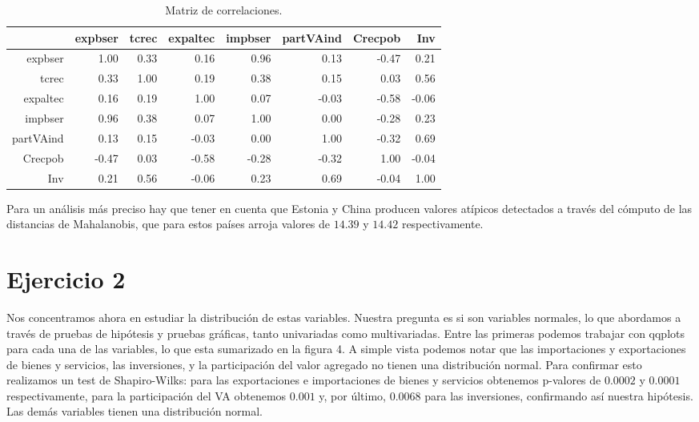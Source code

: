 \documentclass[a4paper,10pt]{article}
\begin{document}
\begin{table}[ht]
\centering
\begin{tabular}{rrrrrrrr}
  \hline
 & expbser & tcrec & expaltec & impbser & partVAind & Crecpob & Inv \\ 
  \hline
expbser & 1.00 & 0.33 & 0.16 & 0.96 & 0.13 & -0.47 & 0.21 \\ 
  tcrec & 0.33 & 1.00 & 0.19 & 0.38 & 0.15 & 0.03 & 0.56 \\ 
  expaltec & 0.16 & 0.19 & 1.00 & 0.07 & -0.03 & -0.58 & -0.06 \\ 
  impbser & 0.96 & 0.38 & 0.07 & 1.00 & 0.00 & -0.28 & 0.23 \\ 
  partVAind & 0.13 & 0.15 & -0.03 & 0.00 & 1.00 & -0.32 & 0.69 \\ 
  Crecpob & -0.47 & 0.03 & -0.58 & -0.28 & -0.32 & 1.00 & -0.04 \\ 
  Inv & 0.21 & 0.56 & -0.06 & 0.23 & 0.69 & -0.04 & 1.00 \\ 
   \hline
\end{tabular}
\caption{Matriz de correlaciones.}
\end{table}

Para un análisis más preciso hay que tener en cuenta que Estonia y China producen valores atípicos detectados a través del cómputo de las distancias
de Mahalanobis, que para estos países arroja valores de $14.39$ y $14.42$ respectivamente.

\section{Ejercicio 2}

Nos concentramos ahora en estudiar la distribución de estas variables. Nuestra pregunta es si son variables normales, lo que abordamos a través de 
pruebas de hipótesis y pruebas gráficas, tanto univariadas como multivariadas.
Entre las primeras podemos trabajar con qqplots para cada una de las variables, lo que esta sumarizado en la figura 4. A simple vista podemos notar que
las importaciones y exportaciones de bienes y servicios, las inversiones, y la participación del valor agregado no tienen una distribución normal.
Para confirmar esto realizamos un test de Shapiro-Wilks: para las exportaciones e importaciones de bienes y servicios obtenemos p-valores de $0.0002$ y
$0.0001$ respectivamente, para la participación del VA obtenemos $0.001$ y, por último, $0.0068$ para las inversiones, confirmando así nuestra hipótesis.
Las demás variables tienen una distribución normal.
\end{document}
